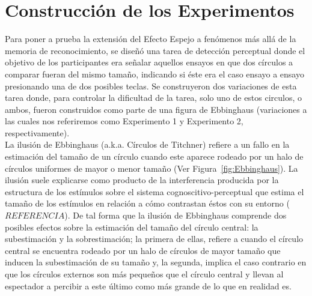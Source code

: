 \section{Construcción de los Experimentos}

Para poner a prueba la extensión del Efecto Espejo a fenómenos más allá de la memoria de reconocimiento, se diseñó una tarea de detección perceptual donde el objetivo de los participantes era señalar aquellos ensayos en que dos círculos a comparar fueran del mismo tamaño, indicando si éste era el caso ensayo a ensayo presionando una de dos posibles teclas. Se construyeron dos variaciones de esta tarea donde, para controlar la dificultad de la tarea, solo uno de estos circulos, o ambos, fueron construidos como parte de una figura de Ebbinghaus (variaciones a las cuales nos referiremos como Experimento 1 y Experimento 2, respectivamente).\\ 

La ilusión de Ebbinghaus (a.k.a. Círculos de Titchner) refiere a un fallo en la estimación del tamaño de un círculo cuando este aparece rodeado por un halo de círculos uniformes de mayor o menor tamaño (Ver Figura~\ref{fig:Ebbinghaus}). La ilusión suele explicarse como producto de la interferencia producida por la estructura de los estímulos sobre el sistema cognoscitivo-perceptual que estima el tamaño de los estímulos en relación a cómo contrastan éstos con su entorno ($REFERENCIA$). De tal forma que la ilusión de Ebbinghaus comprende dos posibles efectos sobre la estimación del tamaño del círculo central: la subestimación y la sobrestimación; la primera de ellas, refiere a cuando el círculo central se encuentra rodeado por un halo de círculos de mayor tamaño que inducen la subestimación de su tamaño y, la segunda, implica el caso contrario en que los círculos externos son más pequeños que el círculo central y llevan al espectador a percibir a este último como más grande de lo que en realidad es.\\

